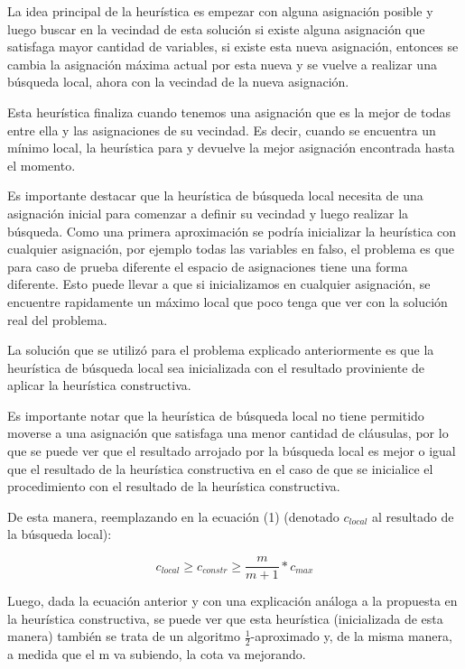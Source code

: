 \documentclass[a4paper,10pt]{article}
\begin{document}
La idea principal de la heur\'istica es empezar con alguna asignaci\'on posible y luego buscar en la vecindad de esta soluci\'on si existe alguna asignaci\'on que satisfaga mayor cantidad de variables, si existe esta nueva asignaci\'on, entonces se cambia la asignaci\'on m\'axima actual por esta nueva y se vuelve a realizar una b\'usqueda local, ahora con la vecindad de la nueva asignaci\'on.

Esta heur\'istica finaliza cuando tenemos una asignaci\'on que es la mejor de todas entre ella y las asignaciones de su vecindad. Es decir, cuando se encuentra un m\'inimo local, la heur\'istica para y devuelve la mejor asignaci\'on encontrada hasta el momento.

Es importante destacar que la heur\'istica de b\'usqueda local necesita de una asignaci\'on inicial para comenzar a definir su vecindad y luego realizar la b\'usqueda. Como una primera aproximaci\'on se podr\'ia inicializar la heur\'istica con cualquier asignaci\'on, por ejemplo todas las variables en falso, el problema es que para caso de prueba diferente el espacio de asignaciones tiene una forma diferente. Esto puede llevar a que si inicializamos en cualquier asignaci\'on, se encuentre rapidamente un m\'aximo local que poco tenga que ver con la soluci\'on real del problema. 

La soluci\'on que se utiliz\'o para el problema explicado anteriormente es que la heur\'istica de b\'usqueda local sea inicializada con el resultado proviniente de aplicar la heur\'istica constructiva.

Es importante notar que la heur\'istica de b\'usqueda local no tiene permitido moverse a una asignaci\'on que satisfaga una menor cantidad de cl\'ausulas, por lo que se puede ver que el resultado arrojado por la b\'usqueda local es mejor o igual que el resultado de la heur\'istica constructiva en el caso de que se inicialice el procedimiento con el resultado de la heur\'istica constructiva.

De esta manera, reemplazando en la ecuaci\'on (1) (denotado $c_{local}$ al resultado de la b\'usqueda local):

\begin{equation}
c_{local} \geq c_{constr} \geq \frac{m}{m+1}*c_{max}
\end{equation}

Luego, dada la ecuaci\'on anterior y con una explicaci\'on an\'aloga a la propuesta en la heur\'istica constructiva, se puede ver que esta heur\'istica (inicializada de esta manera) tambi\'en se trata de un algoritmo $\frac{1}{2}$-aproximado y, de la misma manera, a medida que el m va subiendo, la cota va mejorando.
\end{document}
